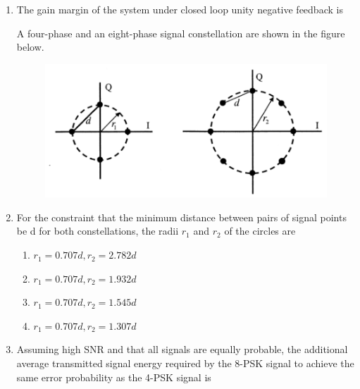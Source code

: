 \documentclass[a4paper, 11pt]{article}
\begin{document}
\begin{enumerate}
    \hfill{}

    \item The gain margin of the system under closed loop unity negative feedback is
    \begin{enumerate}
    \end{enumerate}
    
    \hfill{}
    
    A four-phase and an eight-phase signal constellation are shown in the figure below.
    \begin{figure}[H]
        \centering
        \includegraphics[width=0.8\columnwidth]{figs/q52_53.png}
        \caption*{}
        \label{fig:q52_53}
    \end{figure}

    \item For the constraint that the minimum distance between pairs of signal points be d for both constellations, the radii $r_{1}$ and $r_{2}$ of the circles are
    \begin{enumerate}
        \item $r_{1}=0.707d, r_{2}=2.782d$
        \item $r_{1}=0.707d, r_{2}=1.932d$
        \item $r_{1}=0.707d, r_{2}=1.545d$
        \item $r_{1}=0.707d, r_{2}=1.307d$
    \end{enumerate}
    
    \hfill{}

    \item Assuming high SNR and that all signals are equally probable, the additional average transmitted signal energy required by the 8-PSK signal to achieve the same error probability as the 4-PSK signal is
    \begin{enumerate}
    \end{enumerate}
    

\end{enumerate}
\end{document}
